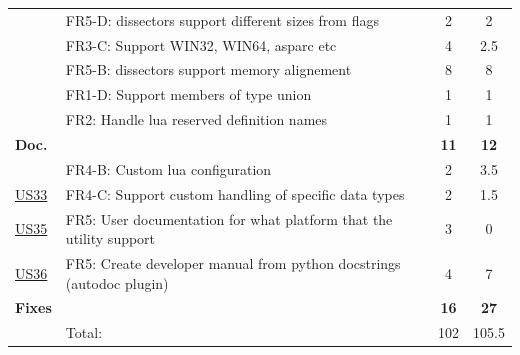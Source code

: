\begin{table}[!htb]
\begin{tabularx}{\textwidth}{l X c c}
	 & FR5-D: \Glspl{dissector} support different sizes from flags & 2 & 2 \\
	 & FR3-C: Support WIN32, WIN64, \gls{asparc} etc & 4 & 2.5 \\
	 & FR5-B: \Glspl{dissector} support memory alignement & 8 & 8 \\
	 & FR1-D: Support members of type \gls{union} & 1 & 1 \\
	 & FR2: Handle \Gls{lua} reserved definition names & 1 & 1 \\
	\addlinespace
	\textbf{Doc.} &  & \textbf{11} & \textbf{12} \\
	 & FR4-B: Custom \Gls{lua} configuration & 2 & 3.5\\
	\hyperref[tab:req:stories8]{US33} & FR4-C: Support custom handling of specific data types & 2 & 1.5 \\
	\hyperref[tab:req:stories9]{US35} & FR5: User documentation for what platform that the \gls{utility} support & 3 & 0 \\
	\hyperref[tab:req:stories9]{US36} & FR5: Create developer manual from \Gls{python} docstrings (autodoc plugin) & 4 & 7 \\
	\addlinespace
	\textbf{Fixes} &  & \textbf{16} & \textbf{27} \\
	\midrule
	& Total: & 102 &  105.5\\
	\bottomrule
\end{tabularx}
\end{table}

